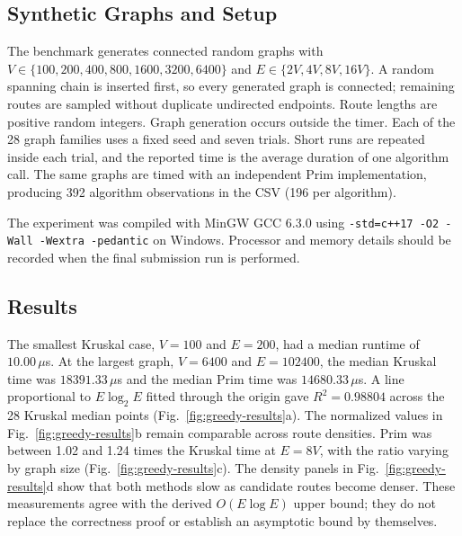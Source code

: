 \documentclass[conference]{IEEEtran}
\begin{document}
\subsection{Synthetic Graphs and Setup}

The benchmark generates connected random graphs with
$V\in\{100,200,400,800,1600,3200,6400\}$ and
$E\in\{2V,4V,8V,16V\}$. A random spanning chain is inserted first, so every
generated graph is connected; remaining routes are sampled without duplicate
undirected endpoints. Route lengths are positive random integers. Graph
generation occurs outside the timer. Each of the 28 graph families uses a
fixed seed and seven trials. Short runs are repeated inside each trial, and
the reported time is the average duration of one algorithm call. The same
graphs are timed with an independent Prim implementation, producing 392
algorithm observations in the CSV (196 per algorithm).

The experiment was compiled with MinGW GCC 6.3.0 using
\texttt{-std=c++17 -O2 -Wall -Wextra -pedantic} on Windows. Processor and
memory details should be recorded when the final submission run is performed.

\subsection{Results}

The smallest Kruskal case, $V=100$ and $E=200$, had a median runtime of
$10.00\,\mu$s. At the largest graph, $V=6400$ and $E=102400$, the median
Kruskal time was $18391.33\,\mu$s and the median Prim time was
$14680.33\,\mu$s. A line proportional to $E\log_2E$ fitted through the
origin gave $R^2=0.98804$ across the 28 Kruskal median points (Fig.~\ref{fig:greedy-results}a).
The normalized values in Fig.~\ref{fig:greedy-results}b remain comparable
across route densities. Prim was between 1.02 and 1.24 times the Kruskal time
at $E=8V$, with the ratio varying by graph size (Fig.~\ref{fig:greedy-results}c).
The density panels in Fig.~\ref{fig:greedy-results}d show that both methods
slow as candidate routes become denser. These measurements agree with the
derived $O(E\log E)$ upper bound; they do not replace the correctness proof or
establish an asymptotic bound by themselves.
\end{document}
